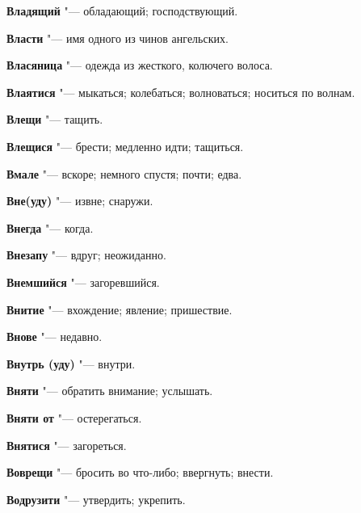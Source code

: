 \begin{mymulticols}{2}
\noindent\textbf{Владящий} "--- обладающий; господствующий. 




\noindent\textbf{Власти} "--- имя одного из чинов ангельских. 




\noindent\textbf{Власяница} "--- одежда из жесткого, колючего волоса. 




\noindent\textbf{Влаятися} "--- мыкаться; колебаться; волноваться; носиться по волнам. 




\noindent\textbf{Влещи} "--- тащить. 




\noindent\textbf{Влещися} "--- брести; медленно идти; тащиться. 




\noindent\textbf{Вмале} "--- вскоре; немного спустя; почти; едва. 




\noindent\textbf{Вне(уду)} "--- извне; снаружи. 




\noindent\textbf{Внегда} "--- когда. 




\noindent\textbf{Внезапу} "--- вдруг; неожиданно. 




\noindent\textbf{Внемшийся} "--- загоревшийся. 




\noindent\textbf{Внитие} "--- вхождение; явление; пришествие. 




\noindent\textbf{Внове} "--- недавно. 




\noindent\textbf{Внутрь (уду)} "--- внутри. 




\noindent\textbf{Вняти} "--- обратить внимание; услышать. 




\noindent\textbf{Вняти от} "--- остерегаться. 




\noindent\textbf{Внятися} "--- загореться. 




\noindent\textbf{Воврещи} "--- бросить во что-либо; ввергнуть; внести. 




\noindent\textbf{Водрузити} "--- утвердить; укрепить. 





\end{mymulticols}

